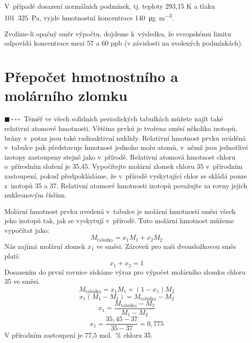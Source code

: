 \documentclass{book}
\newcommand{\jeden}{$\blacksquare \, \square \, \square \, \square \; \; $}
\renewenvironment{quotation}{\par}{\par} %
\begin{document}
V\ případě dosazení normálních podmínek, tj. teploty 293,15 K a tlaku 101~325~Pa, vyjde hmotnostní koncentrace \SI[inter-unit-product = \ensuremath{{}\cdot{}}]{140}{\micro\gram\per\cubic\metre}.

Zvolíme-li opačný směr výpočtu, dojdeme k~výsledku, že evropskému
limitu odpovídá koncentrace mezi 57 a 60 ppb (v závislosti na zvolených
podmínkách). 

\newpage %

\section{Přepočet hmotnostního a molárního zlomku}

\begin{quotation}
\jeden Téměř ve všech solidních periodických tabulkách můžete najít také
relativní atomové hmotnosti. Většina prvků je tvořena směsí několika
izotopů, brány v~potaz jsou také radioaktivní nuklidy. Relativní hmotnost
prvku uváděná v~tabulce pak představuje hmotnost jednoho molu atomů,
v~němž jsou jednotlivé izotopy zastoupeny stejně jako v~přírodě. Relativní
atomová hmotnost chloru o~přírodním složení je 35,45. Vypočítejte
molární zlomek chloru 35 v~přírodním zastoupení, pokud předpokládáme,
že v~přírodě vyskytující chlor se skládá pouze z~izotopů 35 a 37.
Relativní atomové hmotnosti izotopů považujte za rovny jejich nukleonovým
číslům.
\end{quotation} \dotfill \par 
Molární hmotnost prvku uvedená v~tabulce je molární hmotností směsi
všech jeho izotopů tak, jak se vyskytují v~přírodě. Tuto molární hmotnost
můžeme vypočítat jako: 
\[
M_{\mathrm{tabulka}}=x_{1}M_{1}+x_{2}M_{2}
\]
Nás zajímá molární zlomek $x_{1}$ ve směsi. Zároveň pro naši dvousložkovou
směs platí: 
\[
x_{1}+x_{2}=1
\]
Dosazením do první rovnice získáme výraz pro výpočet molárního zlomku
chloru 35 ve směsi. 
\[
M_{\mathrm{tabulka}}=x_{1}M_{1}+\left(1-x_{1}\right)M_{2}
\]
\[
x_{1}\left(M_{1}-M_{2}\right)=M_{\mathrm{tabulka}}-M_{2}
\]
\[
x_{1}=\frac{M_{\mathrm{tabulka}}-M_{2}}{M_{1}-M_{2}}
\]
\[
x_{1}=\frac{35,45-37}{35-37}=0,775
\]
V přírodním zastoupení je 77,5 mol.~\% chloru 35. 
\end{document}
